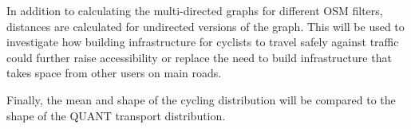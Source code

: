 In addition to calculating the multi-directed graphs for different OSM filters, distances are calculated for undirected versions of the graph. This will be used to investigate how building infrastructure for cyclists to travel safely against traffic could further raise accessibility or replace the need to build infrastructure that takes space from other users on main roads. 

Finally, the mean and shape of the cycling distribution will be compared to the shape of the QUANT transport distribution.  
